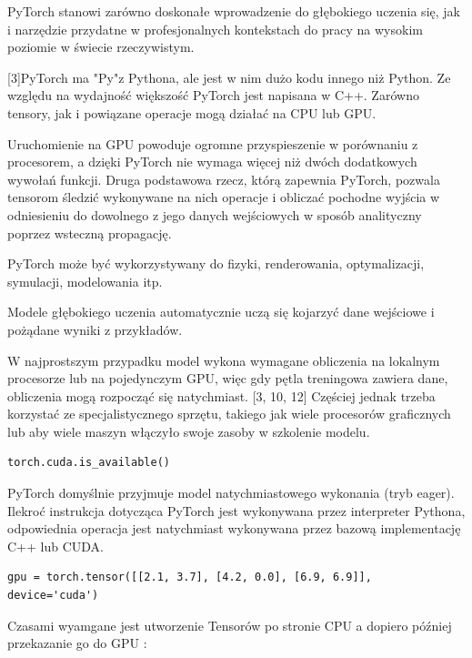 \documentclass[brudnopis]{xmgr}
\begin{document}
PyTorch stanowi zarówno doskonałe wprowadzenie do głębokiego uczenia się, jak i narzędzie przydatne w profesjonalnych kontekstach do pracy na wysokim poziomie w świecie rzeczywistym.

[3]PyTorch ma "Py"z Pythona, ale jest w nim dużo kodu innego niż Python. 
Ze względu na wydajność większość PyTorch jest napisana w C++. 
Zarówno tensory, jak i powiązane operacje mogą działać na CPU lub GPU. 

Uruchomienie na GPU powoduje ogromne przyspieszenie w porównaniu z procesorem, a dzięki PyTorch nie wymaga więcej niż dwóch dodatkowych wywołań funkcji. Druga podstawowa rzecz, którą zapewnia PyTorch, pozwala tensorom śledzić wykonywane na nich operacje i obliczać pochodne wyjścia w odniesieniu do dowolnego z jego danych wejściowych w sposób analityczny poprzez wsteczną propagację. 

PyTorch może być wykorzystywany do fizyki, renderowania, optymalizacji, symulacji, modelowania itp. 

Modele głębokiego uczenia automatycznie uczą się kojarzyć dane wejściowe i pożądane wyniki z przykładów.

W najprostszym przypadku model wykona wymagane obliczenia na lokalnym procesorze lub na pojedynczym GPU, więc gdy pętla treningowa zawiera dane, obliczenia mogą rozpocząć się natychmiast. [3, 10, 12] Częściej jednak trzeba korzystać ze specjalistycznego sprzętu, takiego jak wiele procesorów graficznych lub aby wiele maszyn włączyło swoje zasoby w szkolenie modelu. 


\begin{lstlisting}
torch.cuda.is_available()
\end{lstlisting}


PyTorch domyślnie przyjmuje model natychmiastowego wykonania (tryb eager).
Ilekroć instrukcja dotycząca PyTorch jest wykonywana przez interpreter Pythona, odpowiednia operacja jest natychmiast wykonywana przez bazową implementację C++ lub CUDA. 


\begin{lstlisting}
gpu = torch.tensor([[2.1, 3.7], [4.2, 0.0], [6.9, 6.9]], device='cuda')
\end{lstlisting}

Czasami wyamgane jest utworzenie Tensorów po stronie CPU a dopiero później przekazanie go do GPU :
\end{document}
